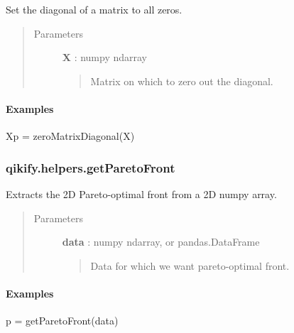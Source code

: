 \documentclass[letterpaper,10pt,english]{sphinxmanual}
\begin{document}
\begin{fulllineitems}
\label{generated/qikify.helpers.zeroMatrixDiagonal:qikify.helpers.zeroMatrixDiagonal}
Set the diagonal of a matrix to all zeros.
\begin{quote}\begin{description}
\item[{Parameters }] \leavevmode
\textbf{X} : numpy ndarray
\begin{quote}

Matrix on which to zero out the diagonal.
\end{quote}

\end{description}\end{quote}
\paragraph{Examples}

Xp = zeroMatrixDiagonal(X)

\end{fulllineitems}



\subsubsection{qikify.helpers.getParetoFront}
\label{generated/qikify.helpers.getParetoFront::doc}\label{generated/qikify.helpers.getParetoFront:qikify-helpers-getparetofront}

\begin{fulllineitems}
\label{generated/qikify.helpers.getParetoFront:qikify.helpers.getParetoFront}
Extracts the 2D Pareto-optimal front from a 2D numpy array.
\begin{quote}\begin{description}
\item[{Parameters }] \leavevmode
\textbf{data} : numpy ndarray, or pandas.DataFrame
\begin{quote}

Data for which we want pareto-optimal front.
\end{quote}

\end{description}\end{quote}
\paragraph{Examples}

p = getParetoFront(data)

\end{fulllineitems}
\end{document}
